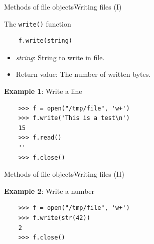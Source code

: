 \documentclass[10pt,compress]{beamer} %
\begin{document}
\begin{frame}[fragile]{Methods of file objects}{Writing files (I)}
	\begin{block}{The \texttt{write()} function}
	\begin{verbatim}
	f.write(string)
	\end{verbatim}

	\vspace{-0.5cm}
	\begin{itemize}
	\item \textit{string}: String to write in file.
	\item Return value: The number of written bytes.
	\end{itemize}
	\end{block}

	\textbf{Example 1}: Write a line
	\begin{verbatim}
	>>> f = open("/tmp/file", 'w+')
	>>> f.write('This is a test\n')
	15
	>>> f.read()
	'' 
	>>> f.close()
	\end{verbatim}


\end{frame}

\begin{frame}[fragile]{Methods of file objects}{Writing files (II)}
	

	\textbf{Example 2}: Write a number %
	\begin{verbatim}
	>>> f = open("/tmp/file", 'w+')
	>>> f.write(str(42))
	2
	>>> f.close()
	\end{verbatim}
\end{frame}
\end{document}

